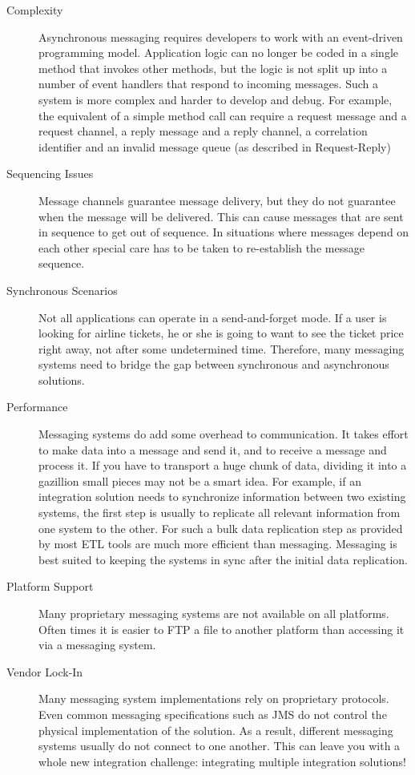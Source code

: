 \documentclass[../Main.tex]{subfiles}
\begin{document}
\begin{description}
    \item[Complexity] Asynchronous messaging requires developers to work with an event-driven programming model. 
    Application logic can no longer be coded in a single method that invokes other methods, but the logic is 
    not split up into a number of event handlers that respond to incoming messages. Such a system is more 
    complex and harder to develop and debug. For example, the equivalent of a simple method call can 
    require a request message and a request channel, a reply message and a reply channel, a correlation 
    identifier and an invalid message queue (as described in Request-Reply)
    \item[Sequencing Issues] Message channels guarantee message delivery, but they do not guarantee when the message will be 
    delivered. This can cause messages that are sent in sequence to get out of sequence. In situations 
    where messages depend on each other special care has to be taken to re-establish the message 
    sequence.
    \item[Synchronous Scenarios] Not all applications can operate in a send-and-forget mode. If a user is looking for airline 
    tickets, he or she is going to want to see the ticket price right away, not after some 
    undetermined time. Therefore, many messaging systems need to bridge the gap between 
    synchronous and asynchronous solutions.
    \item[Performance] Messaging systems do add some overhead to communication. It takes effort to make data 
    into a message and send it, and to receive a message and process it. If you have to 
    transport a huge chunk of data, dividing it into a gazillion small pieces may not be a smart 
    idea. For example, if an integration solution needs to synchronize information between two 
    existing systems, the first step is usually to replicate all relevant information from one 
    system to the other. For such a bulk data replication step as provided by most ETL tools 
    are much more efficient than messaging. Messaging is best suited to keeping the systems 
    in sync after the initial data replication.
    \item[Platform Support]  Many proprietary messaging systems are not available on all platforms. Often times it is easier to FTP a 
    file to another platform than accessing it via a messaging system.
    \item[Vendor Lock-In] Many messaging system implementations rely on proprietary protocols. Even common messaging 
    specifications such as JMS do not control the physical implementation of the solution. As a result, 
    different messaging systems usually do not connect to one another. This can leave you with a whole 
    new integration challenge: integrating multiple integration solutions!
\end{description}
\end{document}
